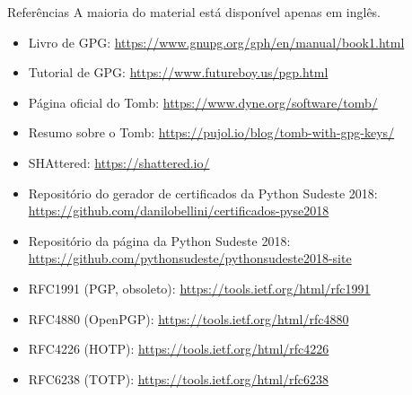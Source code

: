 \documentclass[utf8]{beamer}
\begin{document}
\begin{frame}{Referências}
  \fontsize{11pt}{11pt}\selectfont
  A maioria do material está disponível apenas em inglês.
  \begin{itemize}
    \item Livro de GPG:
          \url{https://www.gnupg.org/gph/en/manual/book1.html}
    \item Tutorial de GPG:
          \url{https://www.futureboy.us/pgp.html}
    \item Página oficial do Tomb:
          \url{https://www.dyne.org/software/tomb/}
    \item Resumo sobre o Tomb:
          \url{https://pujol.io/blog/tomb-with-gpg-keys/}
    \item SHAttered:
          \url{https://shattered.io/}
    \item Repositório do gerador de certificados
          da Python Sudeste 2018:
          \url{https://github.com/danilobellini/certificados-pyse2018}
    \item Repositório da página da Python Sudeste 2018:
          \url{https://github.com/pythonsudeste/pythonsudeste2018-site}
    \item RFC1991 (PGP, obsoleto):
          \url{https://tools.ietf.org/html/rfc1991}
    \item RFC4880 (OpenPGP):
          \url{https://tools.ietf.org/html/rfc4880}
    \item RFC4226 (HOTP):
          \url{https://tools.ietf.org/html/rfc4226}
    \item RFC6238 (TOTP):
          \url{https://tools.ietf.org/html/rfc6238}
  \end{itemize}
  \vfill{}
\end{frame}
\end{document}
